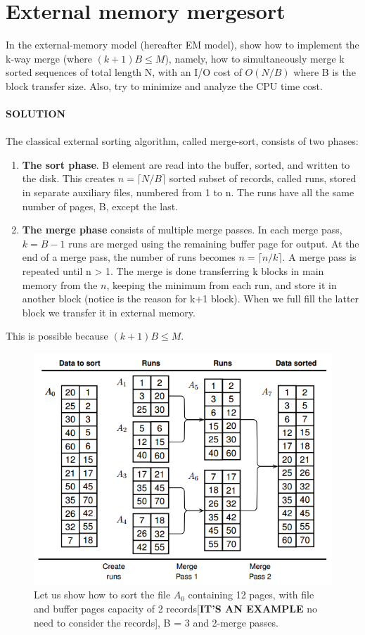 \documentclass[a4paper]{article}
\begin{document}
\section*{External memory mergesort}
In the external-memory model (hereafter EM model),
show how to implement the k-way merge (where $(k + 1)B \leq M$), namely, how to
simultaneously merge k sorted sequences of total length N, with an I/O cost of $O(N/B)$
where B is the block transfer size. Also, try to minimize and analyze the CPU time
cost.
\\
\\
\textbf{SOLUTION}
\\
\\
The classical external sorting algorithm, called merge-sort, consists of two phases:
\begin{enumerate}
\item \textbf{The sort phase}. B element are read into the buffer, sorted, and written to the
disk. This creates $n =\lceil N/B \rceil$ sorted subset of records, called runs, stored
in separate auxiliary files, numbered from 1 to n. The runs have all the same
number of pages, B, except the last.
\item \textbf{The merge phase} consists of multiple merge passes. In each merge pass, $k = B−1$
runs are merged using the remaining buffer page for output. At the end of a merge
pass, the number of runs becomes $n=\lceil n/k \rceil$. A merge pass is repeated until
n > 1. The merge is done transferring k blocks in main memory from the $n$, keeping the minimum from each run, and store it in another block (notice is the reason for k+1 block). When we full fill the latter block we transfer it in external memory.   
\end{enumerate}
This is possible because $(k + 1)B \leq M$.
\begin{figure}[H]
\centering
\includegraphics[scale=0.4]{kway.png}
\caption{Let us show how to sort the file $A_0$ containing 12 pages, with file and buffer pages
capacity of 2 records[\textbf{IT'S AN EXAMPLE} no need to consider the records], B = 3 and 2-merge passes.}
\end{figure}
\end{document}

